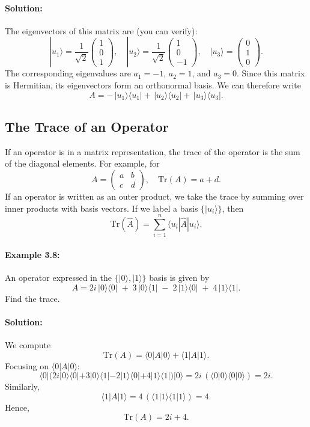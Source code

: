\documentclass{article}
\begin{document}
\paragraph{Solution:}
The eigenvectors of this matrix are (you can verify):
\[
|u_1\rangle 
= \frac{1}{\sqrt{2}}
\begin{pmatrix}1 \\ 0 \\ 1\end{pmatrix},
\quad
|u_2\rangle 
= \frac{1}{\sqrt{2}}
\begin{pmatrix}1 \\ 0 \\ -1\end{pmatrix},
\quad
|u_3\rangle 
= \begin{pmatrix}0 \\ 1 \\ 0\end{pmatrix}.
\]
The corresponding eigenvalues are \(a_1 = -1\), \(a_2 = 1\), and \(a_3 = 0\). Since this matrix is Hermitian, its eigenvectors form an orthonormal basis. We can therefore write
\[
A
= -\,|u_1\rangle\langle u_1| 
+ \,|u_2\rangle\langle u_2|
+ \,|u_3\rangle\langle u_3|.
\]

\subsection{The Trace of an Operator}

If an operator is in a matrix representation, the trace of the operator is the sum of the diagonal elements. For example, for
\[
A = \begin{pmatrix} a & b \\ c & d \end{pmatrix},
\quad
\mathrm{Tr}(A) = a + d.
\]
If an operator is written as an outer product, we take the trace by summing over inner products with basis vectors. If we label a basis \(\{|u_i\rangle\}\), then
\[
\mathrm{Tr}(\hat{A}) 
= \sum_{i=1}^n \langle u_i|\hat{A}|u_i\rangle.
\]

\paragraph{Example 3.8:} 
An operator expressed in the \(\{|0\rangle, |1\rangle\}\) basis is given by
\[
A = 2i\,|0\rangle\langle 0| \;+\; 3\,|0\rangle\langle 1|
      \;-\; 2\,|1\rangle\langle 0| \;+\; 4\,|1\rangle\langle 1|.
\]
Find the trace.

\paragraph{Solution:}
We compute
\[
\mathrm{Tr}(A)
= \langle 0|A|0\rangle + \langle 1|A|1\rangle.
\]
Focusing on \(\langle 0|A|0\rangle\):
\[
\langle 0|\bigl(2i|0\rangle\langle 0| 
+ 3|0\rangle\langle 1|
- 2|1\rangle\langle 0|
+ 4|1\rangle\langle 1|\bigr)|0\rangle
= 2i\,(\langle 0|0\rangle\langle 0|0\rangle) = 2i.
\]
Similarly,
\[
\langle 1|A|1\rangle
= 4\,(\langle 1|1\rangle\langle 1|1\rangle) = 4.
\]
Hence,
\[
\mathrm{Tr}(A) = 2i + 4.
\]
\end{document}

